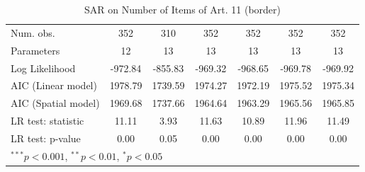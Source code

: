 \begin{table}[!h]
\begin{center}
\begin{tabular}{l c c c c c c }
\midrule
Num. obs.               & 352          & 310         & 352          & 352          & 352          & 352          \\
Parameters              & 12           & 13          & 13           & 13           & 13           & 13           \\
Log Likelihood          & -972.84      & -855.83     & -969.32      & -968.65      & -969.78      & -969.92      \\
AIC (Linear model)      & 1978.79      & 1739.59     & 1974.27      & 1972.19      & 1975.52      & 1975.34      \\
AIC (Spatial model)     & 1969.68      & 1737.66     & 1964.64      & 1963.29      & 1965.56      & 1965.85      \\
LR test: statistic      & 11.11        & 3.93        & 11.63        & 10.89        & 11.96        & 11.49        \\
LR test: p-value        & 0.00         & 0.05        & 0.00         & 0.00         & 0.00         & 0.00         \\
\bottomrule
\multicolumn{7}{l}{\scriptsize{$^{***}p<0.001$, $^{**}p<0.01$, $^*p<0.05$}}
\end{tabular}
\caption{SAR on Number of Items of Art. 11 (border)}
\label{table:coefficients}
\end{center}
\end{table}

